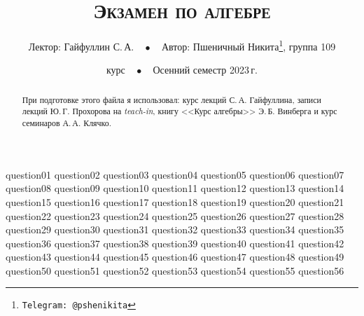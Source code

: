 \documentclass[a4paper, 11pt]{article}
\begin{document}
\title{\bfseries\scshape Экзамен по алгебре}
\author{Лектор: Гайфуллин С.\,А.$\quad\bullet\quad$Автор: Пшеничный Никита\thanks{\texttt{Telegram: @pshenikita}}, группа 109}
\date{ курс$\quad\bullet\quad$Осенний семестр 2023\,г.}

\maketitle

\begin{abstract}
    При подготовке этого файла я использовал: курс лекций С.\,А. Гайфуллина, записи лекций Ю.\,Г. Прохорова на \textit{teach-in}, книгу <<Курс алгебры>> Э.\,Б. Винберга и курс семинаров А.\,А. Клячко.
\end{abstract}

\tableofcontents

{question01}
{question02}
{question03}
{question04}
{question05}
{question06}
{question07}
{question08}
{question09}
{question10}
{question11}
{question12}
{question13}
{question14}
{question15}
{question16}
{question17}
{question18}
{question19}
{question20}
{question21}
{question22}
{question23}
{question24}
{question25}
{question26}
{question27}
{question28}
{question29}
{question30}
{question31}
{question32}
{question33}
{question34}
{question35}
{question36}
{question37}
{question38}
{question39}
{question40}
{question41}
{question42}
{question43}
{question44}
{question45}
{question46}
{question47}
{question48}
{question49}
{question50}
{question51}
{question52}
{question53}
{question54}
{question55}
{question56}
\end{document}
